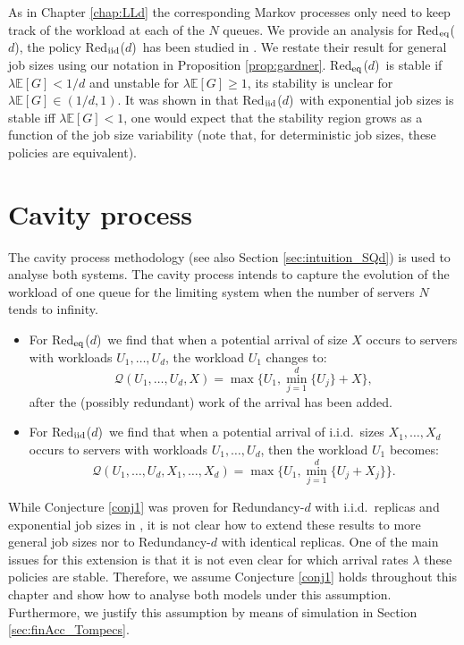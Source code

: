 \documentclass[12pt]{report}
\newcommand{\Redid}{Red$_{\textup{eq}}$($d$)}
\newcommand{\Redind}{Red$_{\textup{iid}}$($d$)}
\newcommand{\E}{\mathbb{E}}
\begin{document}
As in Chapter \ref{chap:LLd} the corresponding Markov processes only need to keep track of the workload at each of the $N$ queues. We provide an analysis for \Redid , the policy \Redind\ has been studied in \cite{gardnerOR}. We restate their result for general job sizes using our notation in Proposition \ref{prop:gardner}. \Redid\ is stable if $\lambda \E[G] < 1/d$ and unstable for $\lambda \E[G] \geq 1$, its stability is unclear for $\lambda \E[G] \in (1/d,1)$. It was shown in \cite{gardnerOR} that \Redind\ with exponential job sizes is stable iff $\lambda \E[G] < 1$, one would expect that the stability region grows as a function of the job size variability (note that, for deterministic job sizes, these policies are equivalent).

\section{Cavity process}\label{sec:cavity_process}
The cavity process methodology (see also Section \ref{sec:intuition_SQd}) is used to analyse both systems. The cavity process intends to capture the evolution of the workload of one queue for the limiting system when the number of servers $N$ tends to infinity.

\begin{itemize}
\item For \Redid\ we find that when a potential arrival of size $X$ occurs to servers with workloads $U_1,\dots,U_d$, the workload $U_1$ changes to: 
$$
\mathcal{Q}(U_1,\dots,U_d,X)=\max\{U_1, \min_{j=1}^d \{U_j\} + X\},
$$
after the (possibly redundant) work of the arrival has been added.
\item For \Redind\ we find that when a potential arrival of i.i.d.~sizes $X_1,\dots,X_d$ occurs to servers with workloads $U_1,\dots, U_d$, then the workload $U_1$ becomes:
$$
\mathcal{Q}(U_1,\dots,U_d,X_1,\dots,X_d)=\max\{U_1, \min_{j=1}^d \{U_j+X_j\}\}.
$$
\end{itemize}
While Conjecture \ref{conj1} was proven for Redundancy-$d$ with i.i.d.~replicas and exponential job sizes in \cite{shneer2020large}, it is not clear how to extend these results to more general job sizes nor to Redundancy-$d$ with identical replicas. One of the main issues for this extension is that it is not even clear for which arrival rates $\lambda$ these policies are stable. Therefore, we assume Conjecture \ref{conj1} holds throughout this chapter and show how to analyse both models under this assumption. Furthermore, we justify this assumption by means of simulation in Section \ref{sec:finAcc_Tompecs}.
\end{document}
